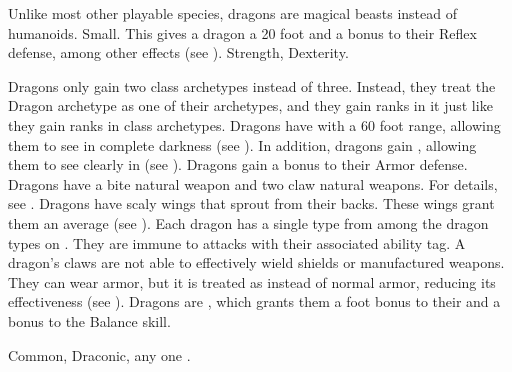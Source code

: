    Unlike most other playable species, dragons are magical beasts instead of humanoids.
   Small. This gives a dragon a 20 foot  and a  bonus to their Reflex defense, among other effects (see ).
    Strength,  Dexterity.
  \begin{raggeditemize}
     Dragons only gain two class archetypes instead of three.
      Instead, they treat the Dragon archetype as one of their archetypes, and they gain ranks in it just like they gain ranks in class archetypes.
     Dragons have  with a 60 foot range, allowing them to see in complete darkness (see ).
      In addition, dragons gain , allowing them to see clearly in  (see ).
     Dragons gain a  bonus to their Armor defense.
     Dragons have a bite natural weapon and two claw natural weapons.
      For details, see .
     Dragons have scaly wings that sprout from their backs.
      These wings grant them an average  (see ).
     Each dragon has a single type from among the dragon types on .
      They are immune to attacks with their associated ability tag.
     A dragon's claws are not able to effectively wield shields or manufactured weapons.
      They can wear armor, but it is treated as  instead of normal armor, reducing its effectiveness (see ).
     Dragons are , which grants them a  foot bonus to their  and a  bonus to the Balance skill.
  \end{raggeditemize}
   Common, Draconic, any one .

